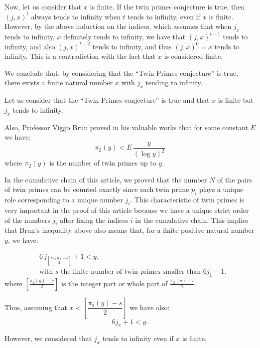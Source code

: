 \documentclass[11pt]{article}
\begin{document}
Now, let us consider that $x$ is finite. If the twin primes conjecture is true, then $(j,x)^t$ always tends to infinity when $t$ tends to infinity, even if $x$ is finite. However, by the above induction on the indices, which assumes that when $j_x$ tends to infinity, $x$ definitely tends to infinity, we have that $(j,x)^{t-1}$ tends to infinity, and also $(j,x)^{t-2}$ tends to infinity, and thus $(j,x)^0 = x$ tends to infinity. This is a contradiction with the fact that $x$ is considered finite.

We conclude that, by considering that the ``Twin Primes conjecture'' is true, there exists a finite natural number $x$ with $j_x$ tending to infinity.

Let us consider that the ``Twin Primes conjecture'' is true and that $x$ is finite but $j_x$ tends to infinity.

Also, Professor Viggo Brun proved in his valuable works \cite{ref4,ref5} that for some constant $E$ we have:
\begin{equation}
\pi_2(y) < E\,\frac{y}{(\log y)^2}
\end{equation}
where $\pi_2(y)$ is the number of twin primes up to $y$.

In the cumulative chain of this article, we proved that the number $N$ of the pairs of twin primes can be counted exactly since each twin prime $p_i$ plays a unique role corresponding to a unique number $j_i$. This characteristic of twin primes is very important in the proof of this article because we have a unique strict order of the numbers $j_i$ after fixing the indices $i$ in the cumulative chain. This implies that Brun's inequality above also means that, for a finite positive natural number $y$, we have:

\begin{equation}
\begin{aligned}&6\, j_{\left[\frac{\pi_2(y)-s}{2}\right]} + 1 < y,\\ &\text{with } s \text{ the finite number of twin primes smaller than } 6j_1-1.\end{aligned}
\end{equation}
 where $\left[\frac{\pi_2(y)-s}{2}\right]$ is the integer part or whole part of $\frac{\pi_2(y)-s}{2}$.
 
Thus, assuming that $x < \left[\dfrac{\pi_2(y)-s}{2}\right]$ we have also:
\begin{equation}
6 j_x + 1 < y.
\end{equation}

However, we considered that $j_x$ tends to infinity even if $x$ is finite.
\end{document}
